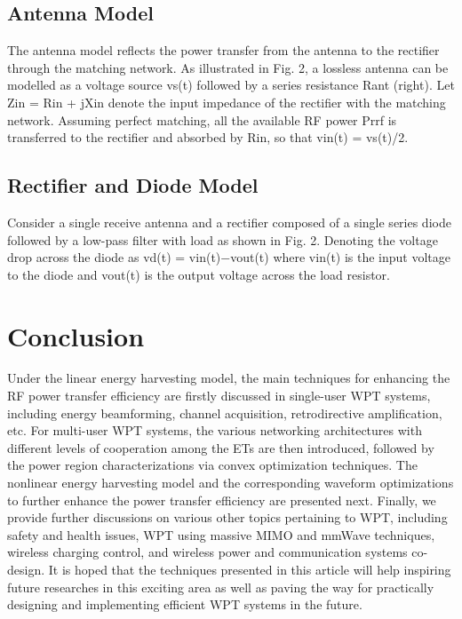 \documentclass[hidelinks, 12pt]{report}
\begin{document}
\begin{itemize}
\begin{itemize}
\begin{itemize}
\begin{itemize}
\begin{itemize}
\section{Antenna Model}
\justify
The antenna model reflects the power transfer from the antenna to the rectifier through the matching network. As illustrated in Fig. 2, a lossless antenna can be modelled as a voltage source vs(t) followed by a series resistance Rant (right). Let Zin = Rin + jXin denote the input impedance of the rectifier with the matching network. Assuming perfect matching, all the available RF power Prrf is transferred to the rectifier and absorbed by Rin, so that vin(t) = vs(t)/2. 
\section{Rectifier and Diode Model}
\justify
Consider a single receive antenna and a rectifier composed of a single series diode followed by a low-pass filter with load as shown in Fig. 2.  Denoting the voltage drop across the diode as vd(t) = vin(t)−vout(t) where vin(t) is the input voltage to the diode and vout(t) is the output voltage across the load resistor. 












\chapter{Conclusion}
\justify
Under the linear energy harvesting model, the main techniques for enhancing the RF power transfer efficiency are firstly discussed in single-user WPT systems, including energy beamforming, channel acquisition, retrodirective amplification, etc. For multi-user WPT systems, the various networking architectures with different levels of cooperation among the ETs are then introduced, followed by the power region characterizations via convex optimization techniques. The nonlinear energy harvesting model and the corresponding waveform optimizations to further enhance the power transfer efficiency are presented next. Finally, we provide further discussions on various other topics pertaining to WPT, including safety and health issues, WPT using massive MIMO and mmWave techniques, wireless charging control, and wireless power and communication systems co-design. It is hoped that the techniques presented in this article will help inspiring future researches in this exciting area as well as paving the way for practically designing and implementing efficient WPT systems in the future.



\end{itemize}
\end{itemize}
\end{itemize}
\end{itemize}
\end{itemize}
\end{document}

